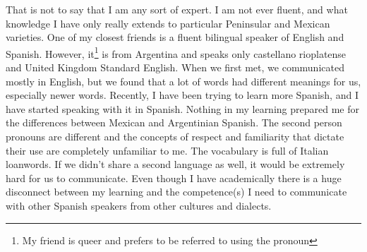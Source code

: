 \documentclass[doc,12pt]{apa6}
\begin{document}
That is not to say that I am any sort of expert. I am not ever fluent, and what 
knowledge I have only really extends to particular Peninsular and Mexican varieties. One 
of my closest friends is a fluent bilingual speaker of English and Spanish. However, 
it\footnote{My friend is queer and prefers to be referred to using the pronoun 
} is from Argentina and speaks only castellano rioplatense and United Kingdom 
Standard English. When we first met, we communicated mostly in English, but we found 
that a lot of words had different meanings for us, especially newer words. Recently, I 
have been trying to learn more Spanish, and I have started speaking with it in Spanish. 
Nothing in my learning prepared me for the differences between Mexican and Argentinian 
Spanish. The second person pronouns are different and the concepts of respect and 
familiarity that dictate their use are completely unfamiliar to me. The vocabulary is 
full of Italian loanwords. If we didn't share a second language as well, it would be 
extremely hard for us to communicate. Even though I have academically  there is a huge disconnect between my learning and the competence(s) I need 
to communicate with other Spanish speakers from other cultures and dialects.
\end{document}
